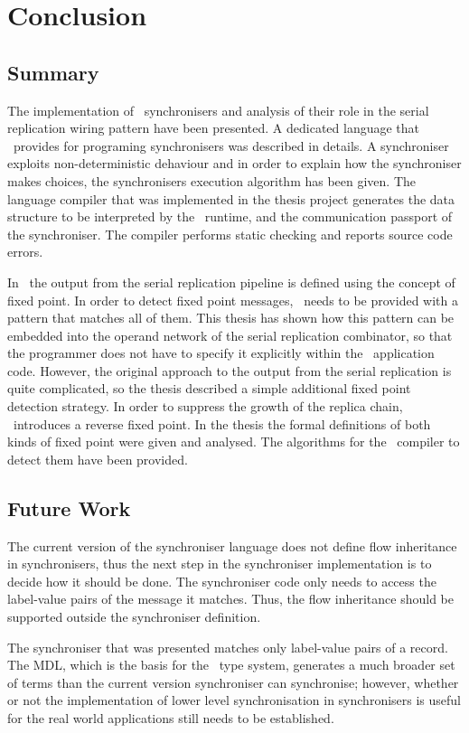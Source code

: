 \chapter{Conclusion} \label{concl}
    \section{Summary}
The implementation of \ak\ synchronisers and analysis of their role in the serial replication wiring pattern have been presented. A dedicated language that \ak\ provides for programing synchronisers was described in details. A synchroniser exploits non-deterministic dehaviour and in order to explain how the synchroniser makes choices, the synchronisers execution algorithm has been given. The language compiler that was implemented in the thesis project generates the data structure to be interpreted by the \ak\ runtime, and the communication passport of the synchroniser. The compiler performs static checking and reports source code errors.

In \ak\ the output from the serial replication pipeline is defined using the concept of fixed point. In order to detect fixed point messages, \ak\ needs to be provided with a pattern that matches all of them. This thesis has shown how this pattern can be embedded into the operand network of the serial replication combinator, so that the programmer does not have to specify it explicitly within the \ak\ application code. However, the original approach to the output from the serial replication is quite complicated, so the thesis described a simple additional fixed point detection strategy. In order to suppress the growth of the replica chain, \ak\ introduces a reverse fixed point. In the thesis the formal definitions of both kinds of fixed point were given and analysed. The algorithms for the \ak\ compiler to detect them have been provided.


    \section{Future Work}
The current version of the synchroniser language does not define flow inheritance in synchronisers, thus the next step in the synchroniser implementation is to decide how it should be done. The synchroniser code only needs to access the label-value pairs of the message it matches. Thus, the flow inheritance should be supported outside the synchroniser definition.

The synchroniser that was presented matches only label-value pairs of a record. The MDL, which is the basis for the \ak\ type system, generates a much broader set of terms than the current version synchroniser can synchronise; however, whether or not the implementation of lower level synchronisation in synchronisers is useful for the real world applications still needs to be established.

